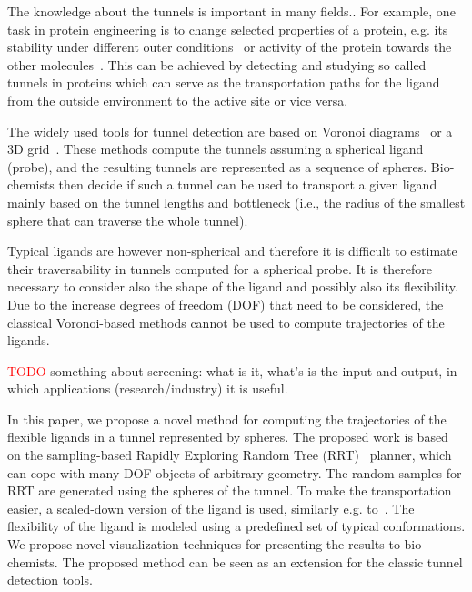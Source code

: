 \documentclass{svmult}
\newcommand{\red}[1]{\textcolor{red}{#1}}
\begin{document}
The knowledge about the tunnels is important in many fields..
For example, one task in protein engineering is to change selected properties of a protein, e.g. its stability under different outer conditions~\cite{Koudelakova2013} or activity of the protein towards the other molecules~\cite{Pavlova2009}.
This can be achieved by detecting and studying so called tunnels in proteins which can serve as the transportation paths for the 
ligand from the outside environment to the active site or vice versa. 

The widely used tools for tunnel detection are based on Voronoi diagrams~\cite{yaffe2008,caver3} or 
a 3D grid~\cite{sehnal2013mole,petrek2006caver}.
These methods compute the tunnels assuming a spherical ligand (probe), and the resulting tunnels are represented as a sequence of spheres.
Bio-chemists then decide if such a tunnel can be used to transport a given ligand mainly based on the tunnel lengths and bottleneck (i.e.,
        the radius of the smallest sphere that can traverse the whole tunnel).

Typical ligands are however non-spherical and therefore it is difficult to estimate their traversability in tunnels
computed for a spherical probe.
It is therefore necessary to consider also the shape of the ligand and possibly also its flexibility.
Due to the increase degrees of freedom (DOF) that need to be considered, the classical Voronoi-based methods cannot be used 
to compute trajectories of the ligands.

\red{TODO}
something about screening: what is it, what's is the input and output, in which applications (research/industry) it is useful.

In this paper, we propose a novel method for computing the trajectories of the flexible ligands in a tunnel represented by spheres.
The proposed work is based on the sampling-based Rapidly Exploring Random Tree (RRT)~\cite{lavalleRRT} planner, which
can cope with many-DOF objects of arbitrary geometry.
The random samples for RRT are generated using the spheres of the tunnel.
To make the transportation easier, a scaled-down version of the ligand is used, similarly e.g. to~\cite{cortes2005path}.
The flexibility of the ligand is modeled using a predefined set of typical conformations.
We propose novel visualization techniques for presenting the results to bio-chemists.
The proposed method can be seen as an extension for the classic tunnel detection tools.
\end{document}
